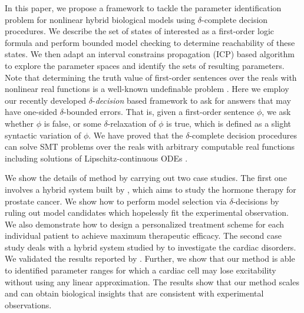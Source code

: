 In this paper, we propose a framework to tackle the parameter identification problem for nonlinear hybrid biological models using $\delta$-complete decision procedures. We describe the set of states of interested as a first-order logic formula and perform bounded model checking to determine reachability of these states. We then adapt an interval constrains propagation (ICP) based algorithm to explore the parameter spaces and identify the sets of resulting parameters. Note that determining the truth value of first-order sentences over the reals with nonlinear real functions is a well-known undefinable problem \citep{?}. Here we employ our recently developed $\delta$-\textit{decision} based framework to ask for answers that may have one-sided $\delta$-bounded errors. That is, given a first-order sentence $\phi$, we ask whether $\phi$ is false, or some $\delta$-relaxation of $\phi$ is true, which is defined as a slight syntactic variation of $\phi$. We have proved that the $\delta$-complete decision procedures can solve SMT problems over the reals with arbitrary computable real functions \citep{gao12a} including solutions of Lipschitz-continuous ODEs \citep{gao12b}.

We show the details of method by carrying out two case studies. The first one involves a hybrid system built by \cite{ideta08}, which aims to study the hormone therapy for prostate cancer. We show how to perform model selection via $\delta$-decisions by ruling out model candidates which hopelessly fit the experimental observation. We also demonstrate how to design a personalized treatment scheme for each individual patient to achieve maximum therapeutic efficacy.
The second case study deals with a hybrid system studied by \cite{grosu11} to investigate the cardiac disorders. We validated the results reported by \cite{grosu11}. Further, we show that our method is able to identified parameter ranges for which a cardiac cell may lose excitability without using any linear approximation.
The results show that our method scales and can obtain biological insights that are consistent with experimental observations.




